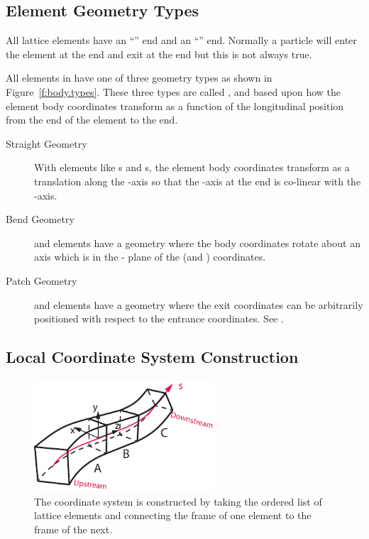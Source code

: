 \documentclass{hitec}
\begin{document}
\subsection{Element Geometry Types}

All lattice elements have an ``'' end and an ``'' end. Normally a particle
will enter the element at the  end and exit at the  end but this is not always
true.

All elements in \bmad have one of three geometry types as shown in Figure~\ref{f:body.types}.  These
three types are called ,  and  based upon how the element body
coordinates transform as a function of the longitudinal  position from the  end
of the element to the  end.
\begin{description}
\item[Straight Geometry] \Newline
With  elements like s and s, the element body coordinates
transform as a translation along the -axis so that the -axis at the  end is
co-linear with the  -axis.
\item[Bend Geometry] \Newline
{} and  elements have a  geometry where the body coordinates rotate
about an axis which is in the - plane of the  (and ) coordinates.
\item[Patch Geometry] \Newline 
{} and  elements have a  geometry where the exit coordinates can
be arbitrarily positioned with respect to the entrance coordinates. See .
\end{description}

\newpage

\subsection{Local Coordinate System Construction}

\begin{figure}[tb]
  \centering
  \includegraphics[width=0.6\textwidth]{element-stream.pdf}
  \caption{The  coordinate system is constructed by taking the ordered list of lattice elements and
connecting the  frame of one element to the  frame of the next.}
  \label{f:leggo}
\end{figure}
\end{document}
